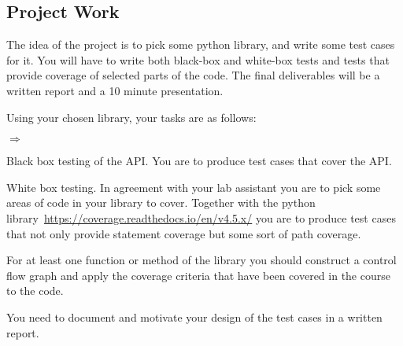 \documentclass[a4page]{article}
\begin{document}
\subsection*{Project Work}

The idea of the project is to pick some python library, and write some
test cases for it. You will have to write both black-box and white-box
tests and tests that provide coverage of selected parts of the code. The final deliverables will be a written report and a 10 minute
presentation.


Using your chosen library, your tasks are as follows:
\begin{list}{$\Rightarrow$}{} 
    \item  Black box testing of the API. You are to produce test cases
      that cover the API.
    \item  White box testing. In agreement with your lab assistant you
      are to pick some areas of code in your library to cover. Together with
      the python library~\url{https://coverage.readthedocs.io/en/v4.5.x/} you are
      to produce test cases that not only provide statement coverage
      but some sort of path coverage. 
    \item For at least one function or method of the library you
      should construct a control flow graph and apply the coverage criteria
      that have been covered in the course to the code.
    \item You need to document and motivate your design of the test cases in
      a written report. 
\end{list}
\end{document}
